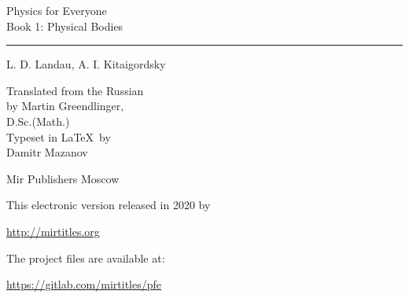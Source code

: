 

\cleardoublepage
\thispagestyle{empty}
\vspace*{1cm}
\begin{center}
\textsf{\Huge Physics for Everyone} \\[10pt] 
\textsf{\huge Book 1: Physical Bodies} \\[10pt]
\hrule
\vspace{10pt}

\textsf{\LARGE L. D. Landau, A. I. Kitaigordsky}\\[15pt]
\begin{flushright}
Translated from the Russian \\by Martin Greendlinger,\\
D.Sc.(Math.)\\[15pt]
Typeset in \LaTeX \, by\\ Damitr Mazanov
\end{flushright}
\vspace{4cm}
\textsf{\Large Mir Publishers Moscow}
\end{center}
\cleardoublepage

\vfill
\vspace*{1cm}
This electronic version released in 2020 by 

\url{http://mirtitles.org}

The project files are available at:

\url{https://gitlab.com/mirtitles/pfe}

\thispagestyle{empty}
\clearpage